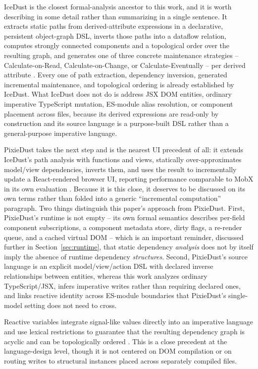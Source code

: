 \documentclass[conference]{IEEEtran}
\begin{document}
IceDust is the closest formal-analysis ancestor to this work, and it is worth
describing in some detail rather than summarizing in a single sentence. It
extracts static paths from derived-attribute expressions in a declarative,
persistent object-graph DSL, inverts those paths into a dataflow relation,
computes strongly connected components and a topological order over the
resulting graph, and generates one of three concrete maintenance strategies
-- Calculate-on-Read, Calculate-on-Change, or Calculate-Eventually -- per
derived attribute \cite{icedust}. Every one of path extraction, dependency
inversion, generated incremental maintenance, and topological ordering is
already established by IceDust. What IceDust does not do is address JSX DOM
entities, ordinary imperative TypeScript mutation, ES-module alias
resolution, or component placement across files, because its derived
expressions are read-only by construction and its source language is a
purpose-built DSL rather than a general-purpose imperative language.

PixieDust takes the next step and is the nearest UI precedent of all: it
extends IceDust's path analysis with functions and views, statically
over-approximates model/view dependencies, inverts them, and uses the result
to incrementally update a React-rendered browser UI, reporting performance
comparable to MobX in its own evaluation \cite{pixiedust}. Because it is this
close, it deserves to be discussed on its own terms rather than folded into a
generic ``incremental computation'' paragraph. Two things distinguish this
paper's approach from PixieDust. First, PixieDust's runtime is not empty --
its own formal semantics describes per-field component subscriptions, a
component metadata store, dirty flags, a re-render queue, and a cached
virtual DOM -- which is an important reminder, discussed further in
Section~\ref{sec:runtime}, that static dependency \emph{analysis} does not by
itself imply the absence of runtime dependency \emph{structures}. Second,
PixieDust's source language is an explicit model/view/action DSL with
declared inverse relationships between entities, whereas this work analyzes
ordinary TypeScript/JSX, infers imperative writes rather than requiring
declared ones, and links reactive identity across ES-module boundaries that
PixieDust's single-model setting does not need to cross.

Reactive variables integrate signal-like values directly into an imperative
language and use lexical restrictions to guarantee that the resulting
dependency graph is acyclic and can be topologically ordered
\cite{reactive-variables}. This is a close precedent at the language-design
level, though it is not centered on DOM compilation or on routing writes to
structural instances placed across separately compiled files.
\end{document}
